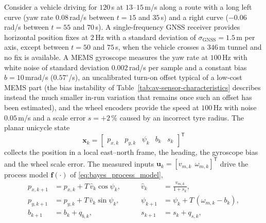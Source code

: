 \documentclass[graybox,envcountchap]{style/SNmono}
\begin{document}
\begin{example}
\label{ex:gnss-imu-odom}
Consider a vehicle driving for $120$\,s at $13$--$15$\,m/s along a route with a long left curve (yaw rate $0.08$\,rad/s between $t=15$ and $35$\,s) and a right curve ($-0.06$\,rad/s between $t=55$ and $70$\,s). A single-frequency GNSS receiver provides horizontal position fixes at $2$\,Hz with a standard deviation of $\sigma_{\mathrm{GNSS}}=1.5$\,m per axis, except between $t=50$ and $75$\,s, when the vehicle crosses a $346$\,m tunnel and no fix is available. A MEMS gyroscope measures the yaw rate at $100$\,Hz with white noise of standard deviation $0.002$\,rad/s per sample and a constant bias $b=10$\,mrad/s ($0.57^{\circ}$/s), an uncalibrated turn-on offset typical of a low-cost MEMS part (the bias instability of Table~\ref{tab:av-sensor-characteristics} describes instead the much smaller in-run variation that remains once such an offset has been estimated), and the wheel encoders provide the speed at $100$\,Hz with noise $0.05$\,m/s and a scale error $s=+2$\,\% caused by an incorrect tyre radius. The planar unicycle state
\begin{equation}
\mathbf{x}_{k}=
\begin{bmatrix}
p_{x,k} & p_{y,k} & \psi_{k} & b_{k} & s_{k}
\end{bmatrix}^{\mathsf T}
\end{equation}
collects the position in a local east--north frame, the heading, the gyroscope bias and the wheel scale error. The measured inputs $\mathbf{u}_{k}=[v_{m,k}\ \ \omega_{m,k}]^{\mathsf T}$ drive the process model $\mathbf{f}(\cdot)$ of \eqref{eq:bayes_process_model},
\begin{equation}
\begin{aligned}
p_{x,k+1}&=p_{x,k}+T\,\hat v_{k}\cos\psi_{k}, &\qquad \hat v_{k}&=\frac{v_{m,k}}{1+s_{k}},\\
p_{y,k+1}&=p_{y,k}+T\,\hat v_{k}\sin\psi_{k}, &\qquad \psi_{k+1}&=\psi_{k}+T\,(\omega_{m,k}-b_{k}),\\
b_{k+1}&=b_{k}+q_{b,k}, &\qquad s_{k+1}&=s_{k}+q_{s,k},
\end{aligned}
\label{eq:gnss-imu-process}
\end{equation}

\end{example}
\end{document}

